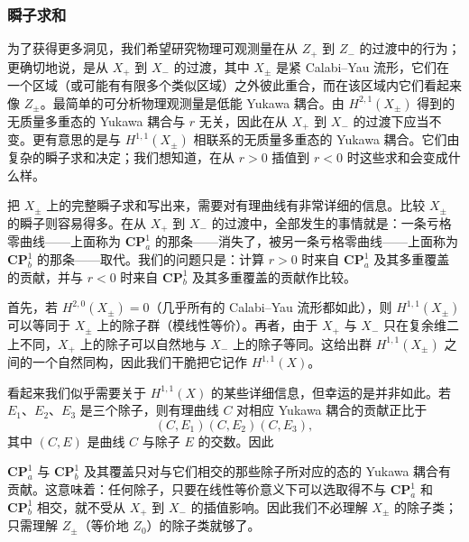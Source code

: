 \label{op:71}

\subsubsection*{瞬子求和}

为了获得更多洞见，我们希望研究物理可观测量在从 $Z_{+}$ 到 $Z_{-}$ 的过渡中的行为；更确切地说，是从 $X_{+}$ 到 $X_{-}$ 的过渡，其中 $X_{\pm}$ 是紧 Calabi--Yau 流形，它们在一个区域（或可能有有限多个类似区域）之外彼此重合，而在该区域内它们看起来像 $Z_{\pm}$。最简单的可分析物理观测量是低能 Yukawa 耦合。由 $H^{2,1}(X_{\pm})$ 得到的无质量多重态的 Yukawa 耦合与 $r$ 无关，因此在从 $X_{+}$ 到 $X_{-}$ 的过渡下应当不变。更有意思的是与 $H^{1,1}(X_{\pm})$ 相联系的无质量多重态的 Yukawa 耦合。它们由复杂的瞬子求和决定；我们想知道，在从 $r>0$ 插值到 $r<0$ 时这些求和会变成什么样。

把 $X_{\pm}$ 上的完整瞬子求和写出来，需要对有理曲线有非常详细的信息。比较 $X_{\pm}$ 的瞬子则容易得多。在从 $X_{+}$ 到 $X_{-}$ 的过渡中，全部发生的事情就是：一条亏格零曲线——上面称为 $\mathbf{CP}^{1}_{a}$ 的那条——消失了，被另一条亏格零曲线——上面称为 $\mathbf{CP}^{1}_{b}$ 的那条——取代。我们的问题只是：计算 $r>0$ 时来自 $\mathbf{CP}^{1}_{a}$ 及其多重覆盖的贡献，并与 $r<0$ 时来自 $\mathbf{CP}^{1}_{b}$ 及其多重覆盖的贡献作比较。

首先，若 $H^{2,0}(X_{\pm})=0$（几乎所有的 Calabi--Yau 流形都如此），则 $H^{1,1}(X_{\pm})$ 可以等同于 $X_{\pm}$ 上的除子群（模线性等价）。再者，由于 $X_{+}$ 与 $X_{-}$ 只在复余维二上不同，$X_{+}$ 上的除子可以自然地与 $X_{-}$ 上的除子等同。这给出群 $H^{1,1}(X_{\pm})$ 之间的一个自然同构，因此我们干脆把它记作 $H^{1,1}(X)$。

看起来我们似乎需要关于 $H^{1,1}(X)$ 的某些详细信息，但幸运的是并非如此。若 $E_{1}$、$E_{2}$、$E_{3}$ 是三个除子，则有理曲线 $C$ 对相应 Yukawa 耦合的贡献正比于
\begin{equation}
\tag{5.41}
(C,E_{1})(C,E_{2})(C,E_{3}),
\end{equation}
其中 $(C,E)$ 是曲线 $C$ 与除子 $E$ 的交数。因此

\label{op:72}
$\mathbf{CP}^{1}_{a}$ 与 $\mathbf{CP}^{1}_{b}$ 及其覆盖只对与它们相交的那些除子所对应的态的 Yukawa 耦合有贡献。这意味着：任何除子，只要在线性等价意义下可以选取得不与 $\mathbf{CP}^{1}_{a}$ 和 $\mathbf{CP}^{1}_{b}$ 相交，就不受从 $X_{+}$ 到 $X_{-}$ 的插值影响。因此我们不必理解 $X_{\pm}$ 的除子类；只需理解 $Z_{\pm}$（等价地 $Z_{0}$）的除子类就够了。

